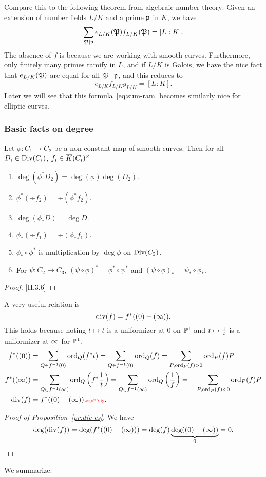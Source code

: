 Compare this to the following theorem from algebraic number theory: Given an extension of number fields $L/K$ and a prime $\mathfrak{p}$ in $K$, we have 
\[
\sum_{\mathfrak{P}\mid \mathfrak{p}}e_{L/K}(\mathfrak{P})f_{L/K}(\mathfrak{P})=[L:K].
\]
The absence of $f$ is because we are working with smooth curves.  Furthermore, only finitely many primes ramify in $L$, and if $L/K$ is Galois, we have the nice fact that $e_{L/K}(\mathfrak{P})$ are equal for all $\mathfrak{P}\mid \mathfrak{p}$, and this reduces to 
\[
e_{L/K}f_{L/K}g_{L/K}=[L:K].
\]
Later we will see that this formula~\eqref{eq:sum-ram} becomes similarly nice for elliptic curves.
\subsubsection{Basic facts on degree}

\begin{pr}
Let $\phi:C_1\to C_2$ be a non-constant map of smooth curves. Then for all $D_i\in \operatorname{Div}(C_i)$, $f_i\in \overline{K}(C_i)^{\times}$
\begin{enumerate}
\item $\deg(\phi^* D_2)=\deg(\phi)\deg(D_2)$.
\item $\phi^*(\div f_2)=\div(\phi^* f_2)$.
\item $\deg(\phi_* D)=\deg D$.
\item $\phi_*(\div f_1)=\div(\phi_* f_1)$.
\item $\phi_*\circ \phi^*$ is multiplication by $\deg \phi$ on $\operatorname{Div}(C_2)$.
\item For $\psi:C_2\to C_3$,
$(\psi\circ \phi)^*=\phi^*\circ \psi^*$ and $(\psi\circ \phi)_*=\psi_*\circ \phi_*$.
\end{enumerate}
\end{pr}
\begin{proof}
\cite{Si86}[II.3.6]
\end{proof}

A very useful relation is
\[
\operatorname{div}(f)=f^*((0)-(\infty)).
\]
This holds because noting $t\mapsto t$ is a uniformizer at 0 on $\mathbb{P}^1$ and $t\mapsto \frac{1}{t}$ is a uniformizer at $\infty$ for $\mathbb{P}^1$,
\begin{align}
f^*((0))&=\sum_{Q\in f^{-1}(0)}\ord_Q(f^*t)=\sum_{Q\in f^{-1}(0)}\ord_Q(f)=\sum_{P,\ord_P(f)>0} \ord_P(f)P\\
f^*((\iy))&=\sum_{Q\in f^{-1}(\iy)}\ord_Q\pa{f^*\rc t}=\sum_{Q\in f^{-1}(\iy)}\ord_Q\prc{f}=-\sum_{P,\ord_P(f)<0} \ord_P(f)P\\
\div(f)%
&=f^*((0)-(\iy)).\llabel{eq:f*0-iy}.
\end{align}
\begin{proof}[Proof of Proposition~\ref{pr:div-es}]
We have 
\[
\deg(\operatorname{div}(f))=\deg(f^*((0)-(\infty)))=\deg(f)\underbrace{\deg((0)-(\infty))}_{0}=0.
\]
\end{proof}
We summarize:

